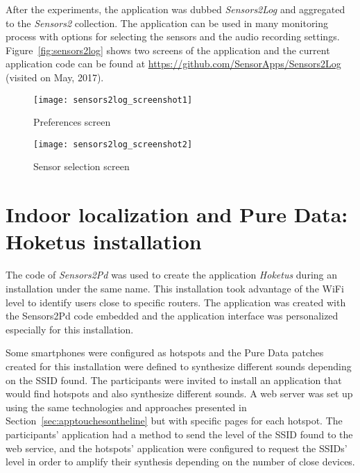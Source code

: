 After the experiments, the application was dubbed \textit{Sensors2Log} and aggregated to the \textit{Sensors2} collection.
The application can be used in many monitoring process with options for selecting the sensors and the audio recording settings.
Figure~\ref{fig:sensors2log} shows two screens of the application and the current application code can be found at \url{https://github.com/SensorApps/Sensors2Log} (visited on May, 2017).

\begin{figure*}[!ht]
\centering
\begin{subfigure}{.35\textwidth}
	\texttt{[image: sensors2log\_screenshot1]}
    \caption{Preferences screen}
	\label{fig:appsensors2log1}
\end{subfigure}
\begin{subfigure}{.35\textwidth}
	\texttt{[image: sensors2log\_screenshot2]}
	\caption{Sensor selection screen}
	\label{fig:appsensors2log2}
\end{subfigure}

\caption{Screen-shots of \textit{Sensors2Log}.}
\label{fig:sensors2log}
\end{figure*}


\section{Indoor localization and Pure Data: Hoketus installation}
\label{apesec:apphoketus}

The code of \textit{Sensors2Pd} was used to create the application \textit{Hoketus} during an installation under the same name.
This installation took advantage of the WiFi level to identify users close to specific routers.
The application was created with the Sensors2Pd code embedded and the application interface was personalized especially for this installation. 

Some smartphones were configured as hotspots and the Pure Data patches created for this installation were defined to synthesize different sounds depending on the SSID found.
The participants were invited to install an application that would find hotspots and also synthesize different sounds.
A web server was set up using the same technologies and approaches presented in Section~\ref{sec:apptouchesontheline} but with specific pages for each hotspot.
The participants' application had a method to send the level of the SSID found to the web service, and the hotspots' application were configured to request the SSIDs' level in order to amplify their synthesis depending on the number of close devices.

